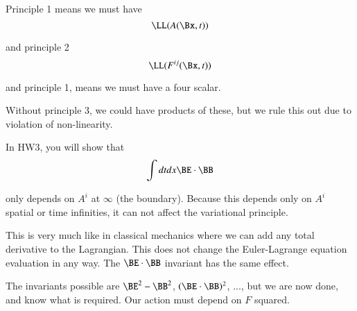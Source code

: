 Principle 1 means we must have
%
\begin{equation}\label{eqn:relativisticElectrodynamicsL12b:230}
\LL(A(\Bx, t))
\end{equation}

and principle 2
%
\begin{equation}\label{eqn:relativisticElectrodynamicsL12b:250}
\LL(F^{ij}(\Bx, t))
\end{equation}

and principle 1, means we must have a four scalar.

Without principle 3, we could have products of these, but we rule this out due to violation of non-linearity.
%

In HW3, you will show that
%
\begin{equation}\label{eqn:relativisticElectrodynamicsL12b:350}
\int dt dx \BE \cdot \BB
\end{equation}

only depends on \(A^i\) at \(\infty\) (the boundary).  Because this depends only on \(A^i\) spatial or time infinities, it can not affect the variational principle.

This is very much like in classical mechanics where we can add any total derivative to the Lagrangian.  This does not change the Euler-Lagrange equation evaluation in any way.  The \(\BE \cdot \BB\) invariant has the same effect.

The invariants possible are \(\BE^2 - \BB^2\), \((\BE \cdot \BB)^2\), ..., but we are now done, and know what is required.  Our action must depend on \(F\) squared.

